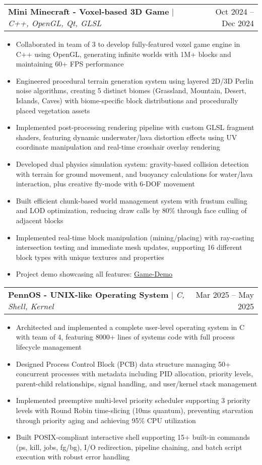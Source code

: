 \documentclass[letterpaper,11pt]{article}
\makeatletter
\newcommand{\resumeItem}[1]{
  \item\small{
    {#1 \vspace{-3pt}}
  }
}
\newcommand{\resumeProjectHeading}[2]{
    \item
    \begin{tabular*}{0.97\textwidth}{l@{\extracolsep{\fill}}r}
      \small#1 & #2 \\
    \end{tabular*}\vspace{-7pt}
}
\newcommand{\resumeItemListStart}{\begin{itemize}}
\newcommand{\resumeItemListEnd}{\end{itemize}\vspace{-5pt}}
\makeatother
\begin{document}
\resumeProjectHeading
      {\textbf{Mini Minecraft - Voxel-based 3D Game} $|$ \emph{C++, OpenGL, Qt, GLSL}}{Oct 2024 -- Dec 2024}
      \resumeItemListStart
      \resumeItem{Collaborated in team of 3 to develop fully-featured voxel game engine in C++ using OpenGL, generating infinite worlds with 1M+ blocks and maintaining 60+ FPS performance}
      \resumeItem{Engineered procedural terrain generation system using layered 2D/3D Perlin noise algorithms, creating 5 distinct biomes (Grassland, Mountain, Desert, Islands, Caves) with biome-specific block distributions and procedurally placed vegetation assets}
      \resumeItem{Implemented post-processing rendering pipeline with custom GLSL fragment shaders, featuring dynamic underwater/lava distortion effects using UV coordinate manipulation and real-time crosshair overlay rendering}
      \resumeItem{Developed dual physics simulation system: gravity-based collision detection with terrain for ground movement, and buoyancy calculations for water/lava interaction, plus creative fly-mode with 6-DOF movement}
      \resumeItem{Built efficient chunk-based world management system with frustum culling and LOD optimization, reducing draw calls by 80\% through face culling of adjacent blocks}
      \resumeItem{Implemented real-time block manipulation (mining/placing) with ray-casting intersection testing and immediate mesh updates, supporting 16 different block types with unique textures and properties}
      \resumeItem{Project demo showcasing all features: \href{https://youtu.be/jRb4EHV5KQI}{\underline{Game-Demo}}}
      \resumeItemListEnd

      \resumeProjectHeading
      {\textbf{PennOS - UNIX-like Operating System} $|$ \emph{C, Shell, Kernel}}{Mar 2025 -- May 2025}
      \resumeItemListStart
        \resumeItem{Architected and implemented a complete user-level operating system in C with team of 4, featuring 8000+ lines of systems code with full process lifecycle management}
        \resumeItem{Designed Process Control Block (PCB) data structure managing 50+ concurrent processes with metadata including PID allocation, priority levels, parent-child relationships, signal handling, and user/kernel stack management}
        \resumeItem{Implemented preemptive multi-level priority scheduler supporting 3 priority levels with Round Robin time-slicing (10ms quantum), preventing starvation through priority aging and achieving 95\% CPU utilization}
        \resumeItem{Built POSIX-compliant interactive shell supporting 15+ built-in commands (ps, kill, jobs, fg/bg), I/O redirection, pipeline chaining, and batch script execution with robust error handling}
      \resumeItemListEnd
      
\end{document}
